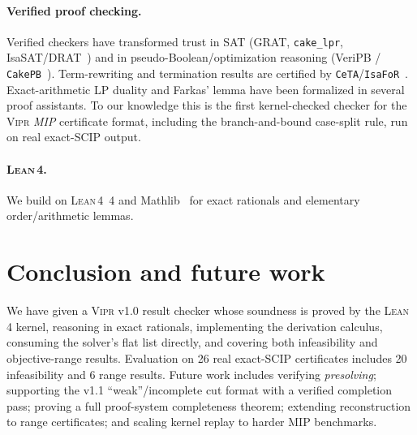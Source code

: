 \documentclass[runningheads]{llncs}
\newcommand{\code}[1]{\texttt{#1}}
\newcommand{\scip}{\textsc{SCIP}}
\newcommand{\vipr}{\textsc{Vipr}}
\newcommand{\lean}{\textsc{Lean\,4}}
\begin{document}
\paragraph{Verified proof checking.} Verified checkers have transformed trust in SAT
(GRAT, \code{cake\_lpr}, IsaSAT/DRAT~\cite{grat,cakelpr}) and in pseudo-Boolean/optimization
reasoning (VeriPB / \code{CakePB}~\cite{veripb}). Term-rewriting and termination results
are certified by \code{CeTA}/\code{IsaFoR}~\cite{ceta}. Exact-arithmetic LP duality and
Farkas' lemma have been formalized in several proof assistants. To our knowledge this is
the first kernel-checked checker for the \vipr{} \emph{MIP} certificate format, including
the branch-and-bound case-split rule, run on real exact-\scip{} output.

\paragraph{\lean{}.} We build on \lean~4 and Mathlib~\cite{mathlib} for exact rationals
and elementary order/arithmetic lemmas.

\section{Conclusion and future work}\label{sec:concl}

We have given a \vipr{} v1.0 result checker whose soundness is proved by the \lean{}
kernel, reasoning in exact rationals, implementing the derivation calculus, consuming
the solver's flat list directly, and covering both infeasibility and objective-range
results. Evaluation on 26 real exact-\scip{} certificates includes 20 infeasibility and
6 range results. Future work includes verifying \emph{presolving}; supporting the v1.1
``weak''/incomplete cut format with a verified completion pass; proving a full
proof-system completeness theorem; extending reconstruction to range certificates; and
scaling kernel replay to harder MIP benchmarks.
\end{document}
